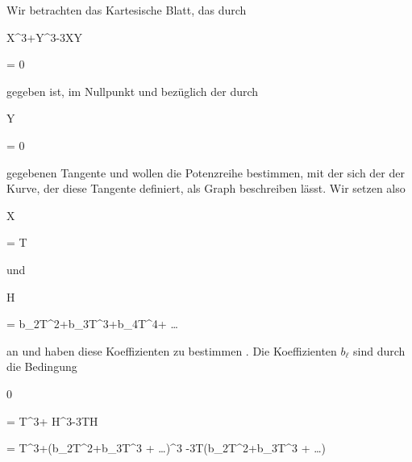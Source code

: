 
{


Wir betrachten
das Kartesische Blatt,
das durch


\mavergleichskette

{\vergleichskette

{ X^3+Y^3-3XY
}

{ = }{ 0
}

{  }{
}

{    }{
}

{   }{
}

}
{}{}{}
gegeben ist, im Nullpunkt und bezüglich der durch


\mavergleichskette

{\vergleichskette

{Y
}

{ = }{ 0
}

{  }{
}

{    }{
}

{   }{
}

}
{}{}{}
gegebenen Tangente und wollen die Potenzreihe bestimmen, mit der sich der  der Kurve, der diese Tangente definiert, als Graph beschreiben lässt. Wir setzen also


\mavergleichskette

{\vergleichskette

{X
}

{ = }{ T
}

{  }{
}

{    }{
}

{   }{
}

}
{}{}{}
und


\mavergleichskette

{\vergleichskette

{ H
}

{ = }{ b_2T^2+b_3T^3+b_4T^4+ \ldots
}

{  }{
}

{    }{
}

{   }{
}

}
{}{}{}
an und haben diese Koeffizienten zu bestimmen
 {} {.}
Die Koeffizienten $b_\ell$ sind durch die Bedingung


\mavergleichskettealign

{\vergleichskettealign

{ 0
}

{ =} { T^3+ H^3-3TH
}

{ =} { T^3+(b_2T^2+b_3T^3 + \ldots )^3 -3T(b_2T^2+b_3T^3 + \ldots )
}

}}
